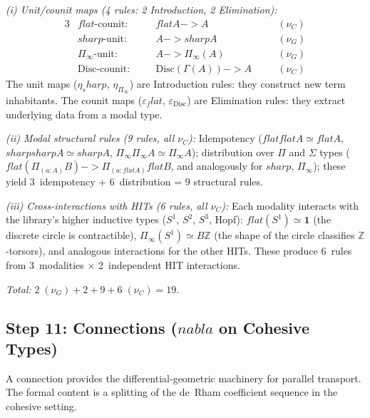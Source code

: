 \documentclass[11pt,a4paper]{article}
\def\to{->}%
\def\nabla{nabla}%
\def\flat{flat}%
\def\sharp{sharp}%
\theoremstyle{plain}
\theoremstyle{definition}
\theoremstyle{remark}
\newcommand{\Z}{\mathbb{Z}}
\begin{document}
\emph{(i) Unit/counit maps (4 rules: 2 Introduction, 2 Elimination):}
\begin{alignat*}{3}
    &\flat\text{-counit:}  &\quad& \flat A \to A  && \quad (\nu_C) \\
    &\sharp\text{-unit:}   && A \to \sharp A  && \quad (\nu_G) \\
    &\Pi_{\!\infty}\text{-unit:}   && A \to \Pi_{\!\infty}(A)  && \quad (\nu_G) \\
    &\mathrm{Disc}\text{-counit:}   && \mathrm{Disc}(\Gamma(A)) \to A  && \quad (\nu_C)
\end{alignat*}
The unit maps ($\eta_\sharp$, $\eta_{\Pi_\infty}$) are Introduction rules: they construct new term inhabitants.
The counit maps ($\varepsilon_\flat$, $\varepsilon_{\mathrm{Disc}}$) are Elimination rules: they extract underlying data from a modal type.

\emph{(ii) Modal structural rules (9 rules, all $\nu_C$):}
Idempotency ($\flat\flat A \simeq \flat A$, $\sharp\sharp A \simeq \sharp A$, $\Pi_{\!\infty}\Pi_{\!\infty} A \simeq \Pi_{\!\infty} A$); distribution over $\Pi$ and $\Sigma$ types ($\flat(\Pi_{(a:A)} B) \to \Pi_{(a:\flat A)} \flat B$, and analogously for $\sharp$, $\Pi_{\!\infty}$); these yield 3~idempotency + 6~distribution = 9 structural rules.

\emph{(iii) Cross-interactions with HITs (6 rules, all $\nu_C$):}
Each modality interacts with the library's higher inductive types ($S^1$, $S^2$, $S^3$, Hopf): $\flat(S^1) \simeq \mathbf{1}$ (the discrete circle is contractible), $\Pi_{\!\infty}(S^1) \simeq B\Z$ (the shape of the circle classifies $\Z$-torsors), and analogous interactions for the other HITs.
These produce 6~rules from 3~modalities $\times$ 2~independent HIT interactions.

\emph{Total:} $2\;(\nu_G) + 2 + 9 + 6\;(\nu_C) = 19$.

\subsection{\texorpdfstring{Step 11: Connections ($\nabla$ on Cohesive Types)}{Step 11: Connections (nabla on Cohesive Types)}}
\label{app:connections-spec}

A connection provides the differential-geometric machinery for parallel transport.
The formal content is a splitting of the de~Rham coefficient sequence in the cohesive setting.
\end{document}
